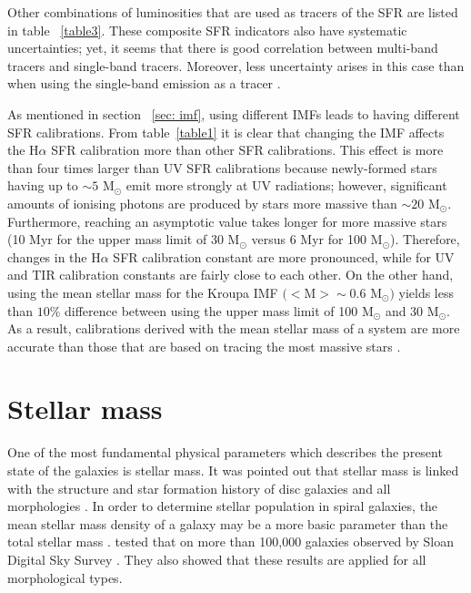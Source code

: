 Other combinations of luminosities that are used as tracers of the SFR are listed in table ~\ref{table3}. These composite SFR indicators also have systematic uncertainties; yet, it seems that there is good correlation between multi-band tracers and single-band tracers. Moreover, less uncertainty arises in this case than when using the single-band emission as a tracer \citep{Kennicutt09}. 

As mentioned in section ~\ref{sec: imf}, using different IMFs leads to having different SFR calibrations. From table~\ref{table1} it is clear that changing the IMF affects the H${\alpha}$ SFR calibration more than other SFR calibrations. This effect is more than four times larger than UV SFR calibrations because newly-formed stars having up to $\sim 5$ M$_{\odot}$ emit more strongly at UV radiations; however, significant amounts of ionising photons are produced by stars more massive than $\sim 20$ M$_{\odot}$. Furthermore, reaching an asymptotic value takes longer for more massive stars (10 Myr for the upper mass limit of 30 M$_{\odot}$ versus 6 Myr for 100 M$_{\odot}$). Therefore, changes in the H${\alpha}$ SFR calibration constant are more pronounced, while for UV and TIR calibration constants are fairly close to each other. On the other hand, using the mean stellar mass for the Kroupa IMF $(<$M$> \sim 0.6$ M$_{\odot})$ yields less than $10\%$ difference between using the upper mass limit of 100 M$_{\odot}$ and 30 M$_{\odot}$. As a result, calibrations derived with the mean stellar mass of a system are more accurate than those that are based on tracing the most massive stars \citep{Calzetti13}.

\section{Stellar mass}
\label{sec: starmass_intro}
One of the most fundamental physical parameters which describes the present state of the galaxies is stellar mass. It was pointed out that stellar mass is linked with the structure and star formation history of disc galaxies \citep{Gavvazi96} and all morphologies \citep{Scodeggio02}. In order to determine stellar population in spiral galaxies, the mean stellar mass density of a galaxy may be a more basic parameter than the total stellar mass \citep{Bell00}. \cite{Kauffmann03} tested that on more than 100,000 galaxies observed by Sloan Digital Sky Survey \citep[SDSS;][]{York00}. They also showed that these results are applied for all morphological types.

